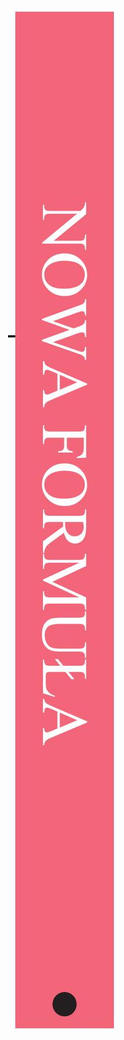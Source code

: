\documentclass[10pt]{article}
\begin{document}
\includegraphics[max width=\textwidth, center]{2024_11_21_7b5527312ea89ae66fd0g-01(3)}
\end{document}
